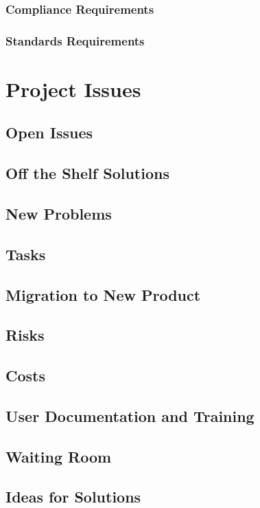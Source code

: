 \documentclass[12pt, titlepage]{article}
\begin{document}
\subsubsection{Compliance Requirements}
\subsubsection{Standards Requirements}


\section{Project Issues}
\subsection{Open Issues}
\subsection{Off the Shelf Solutions}
\subsection{New Problems}
\subsection{Tasks}
\subsection{Migration to New Product}
\subsection{Risks}
\subsection{Costs}
\subsection{User Documentation and Training}
\subsection{Waiting Room}
\subsection{Ideas for Solutions}
\end{document}
